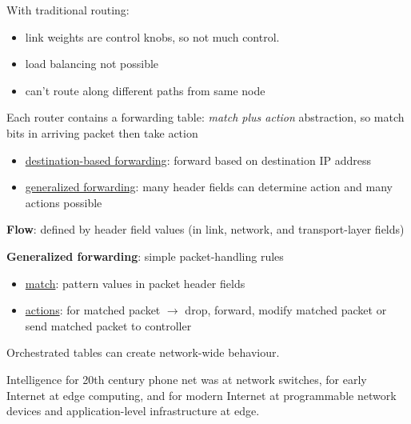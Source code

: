\documentclass[11pt]{article}
\begin{document}
With traditional routing:
\begin{itemize}
\item link weights are control knobs, so not much control.
\item load balancing not possible
\item can't route along different paths from same node
\end{itemize}

Each router contains a forwarding table: \emph{match plus action} abstraction, so match bits in arriving
packet then take action
\begin{itemize}
\item \uline{destination-based forwarding}: forward based on destination IP address
\item \uline{generalized forwarding}: many header fields can determine action and many actions possible
\end{itemize}

\textbf{Flow}: defined by header field values (in link, network, and transport-layer fields)

\textbf{Generalized forwarding}: simple packet-handling rules
\begin{itemize}
\item \uline{match}: pattern values in packet header fields
\item \uline{actions}: for matched packet \(\to\) drop, forward, modify matched packet or send matched packet to
controller
\end{itemize}

Orchestrated tables can create network-wide behaviour.

Intelligence for 20th century phone net was at network switches, for early Internet at edge computing,
and for modern Internet at programmable network devices and application-level infrastructure at edge.
\end{document}
